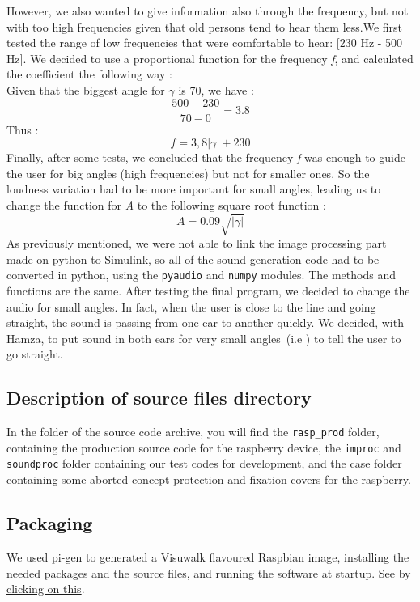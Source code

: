 \documentclass{rapport}
\begin{document}
However, we also wanted to give information also through the frequency, but not with too high frequencies given that old persons tend to hear them less.We first tested the range of low frequencies that were comfortable to hear: [230 Hz - 500 Hz]. We decided to use a proportional function for the frequency \emph{f}, and calculated the coefficient the following way :\\
Given that the biggest angle for \(\gamma\) is 70, we have :
\[ \frac{500 - 230}{70 -0} = 3.8\]
Thus : 
\[ f = 3,8 |\gamma| + 230\]
Finally, after some tests, we concluded that the frequency \emph{f} was enough to guide the user for big angles (high frequencies) but not for smaller ones. So the loudness variation had to be more important for small angles, leading us to change the function for \emph{A} to the following square root function :
\[ A = 0.09\sqrt{|\gamma|} \]
As previously mentioned, we were not able to link the image processing part made on python to Simulink, so all of the sound generation code had to be converted in python, using the \verb|pyaudio| and \verb|numpy| modules. The methods and functions are the same.
After testing the final program, we decided to change the audio for small angles. In fact, when the user is close to the line and going straight, the sound is passing from one ear to another quickly. We decided, with Hamza, to put sound in both ears for very small angles\ (i.e \gamma \in [-4,4])\) to tell the user to go straight.



\subsection{Description of source files directory}

In the folder of the source code archive, you will find the \verb|rasp_prod| folder, containing the production source code for the raspberry device, the \verb|improc| and \verb|soundproc| folder containing our test codes for development, and the case folder containing some aborted concept protection and fixation covers for the raspberry.

\subsection{Packaging}

We used pi-gen to generated a Visuwalk flavoured Raspbian image, installing the needed packages and the source files, and running the software at startup. See \href{https://github.com/RPi-Distro/pi-gen}{by clicking on this}.
\end{document}

